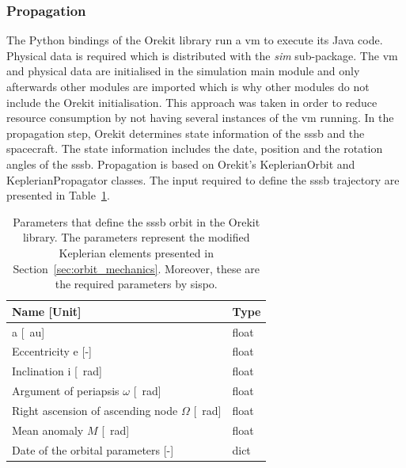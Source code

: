 
\subsubsection{Propagation}
The Python bindings of the Orekit library run a \gls{vm} to execute its Java code. Physical data is required which is distributed with the \textit{sim} sub-package. The \gls{vm} and physical data are initialised in the simulation main module and only afterwards other modules are imported which is why other modules do not include the Orekit initialisation. This approach was taken in order to reduce resource consumption by not having several instances of the \gls{vm} running. In the propagation step, Orekit determines state information of the \gls{sssb} and the spacecraft. The state information includes the date, position and the rotation angles of the \gls{sssb}. Propagation is based on Orekit's KeplerianOrbit and KeplerianPropagator classes. The input required to define the \gls{sssb} trajectory are presented in Table~\ref{tab:keplerorbit_params}.

\begin{table}[htb]
    \centering
    \caption{Parameters that define the \gls{sssb} orbit in the Orekit library. The parameters represent the modified Keplerian elements presented in Section~\ref{sec:orbit_mechanics}. Moreover, these are the required parameters by \gls{sispo}.}
    \label{tab:keplerorbit_params}
    \begin{tabular}{p{}|p{}}
        \textbf{Name [Unit]} & \textbf{Type} \\ \hline
        \gls{a} [\SI{}{\astronomicalunit}] & float\\
        Eccentricity e [-] & float\\
        Inclination i [\SI{}{\radian}] & float \\
        Argument of periapsis  $\omega$ [\SI{}{\radian}] & float \\
        Right ascension of ascending node $\Omega$ [\SI{}{\radian}] & float \\
        Mean anomaly $M$ [\SI{}{\radian}] & float \\
        Date of the orbital parameters [-] & dict\footnotemark
    \end{tabular}
\end{table}

